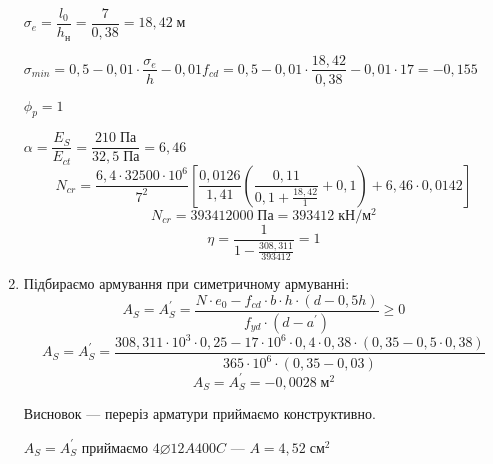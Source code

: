 \documentclass[a4paper,14pt]{article}
\begin{document}
\begin{enumerate}
    $\sigma_e = \dfrac{l_0}{h_\textit{н}} = \dfrac{7}{0,38} = 18,42\;\textit{м}$

    $\sigma_{min} = 0,5 - 0,01 \cdot \dfrac{\sigma_e}{h} - 0,01f_{cd} =  0,5 - 0,01 \cdot \dfrac{18,42}{0,38} - 0,01 \cdot 17 = -0,155$

    $\phi_p = 1$

    $\alpha = \dfrac{E_S}{E_{ct}} = \dfrac{210\;\textit{Па}}{32,5\;\textit{Па}} = 6,46$
    $$N_{cr} = \frac{6,4 \cdot 32500 \cdot 10^6}{7^2}\left[\frac{0,0126}{1,41}\left(\frac{0,11}{0,1 + \frac{18,42}{1}} + 0,1\right) + 6,46 \cdot 0,0142\right]$$
    $$N_{cr} = 393412000\;\textit{Па} = 393412\;\textit{кН}/\textit{м}^2$$
    $$\eta = \frac{1}{1 - \frac{308,311}{393412}} = 1$$
  
\item Підбираємо армування при симетричному армуванні:
    \begin{equation}
        A_S = A_S^\prime = \frac{N \cdot e_0 - f_{cd} \cdot b \cdot h \cdot (d - 0,5h)}{f_{yd} \cdot (d - a^\prime)} \geqslant 0
    \end{equation}
    $$A_S = A_S^\prime = \frac{308,311 \cdot 10^3 \cdot 0,25 - 17 \cdot 10^6 \cdot 0,4 \cdot 0,38 \cdot (0,35 - 0,5 \cdot 0,38)}{365 \cdot 10^6 \cdot (0,35 - 0,03)}$$
    $$A_S = A_S^\prime = -0,0028\;\textit{м}^2$$

    Висновок --- переріз арматури приймаємо конструктивно.

    $A_S = A_S^\prime$ приймаємо $4\varnothing12A400C$ --- $A = 4,52\;\textit{см}^2$
\end{enumerate}
\end{document}

